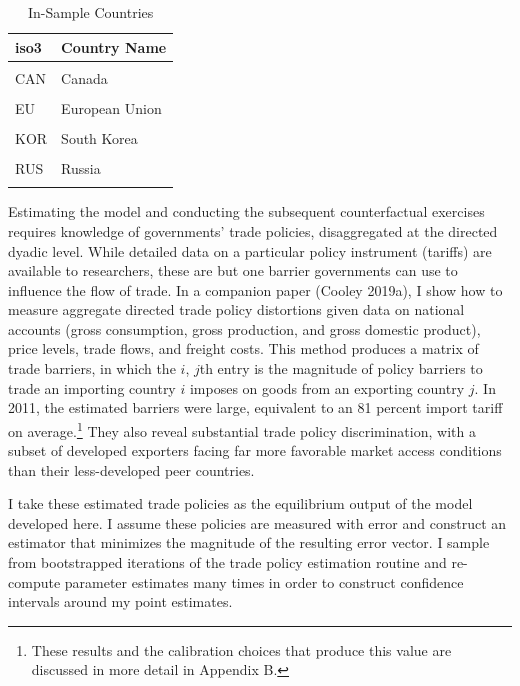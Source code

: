 \documentclass{puthesis}
\begin{document}
\begin{table}

\caption{\label{tab:ccodes}In-Sample Countries \label{tab:ccodes}}
\centering
\begin{tabular}[t]{ll}
\toprule
iso3 & Country Name\\
\midrule
\cellcolor{gray!6}{AUS} & \cellcolor{gray!6}{Australia}\\
CAN & Canada\\
\cellcolor{gray!6}{CHN} & \cellcolor{gray!6}{China}\\
EU & European Union\\
\cellcolor{gray!6}{JPN} & \cellcolor{gray!6}{Japan}\\
\addlinespace
KOR & South Korea\\
\cellcolor{gray!6}{RoW} & \cellcolor{gray!6}{Rest of World}\\
RUS & Russia\\
\cellcolor{gray!6}{USA} & \cellcolor{gray!6}{United States}\\
\bottomrule
\end{tabular}
\end{table}

Estimating the model and conducting the subsequent counterfactual
exercises requires knowledge of governments' trade policies,
disaggregated at the directed dyadic level. While detailed data on a
particular policy instrument (tariffs) are available to researchers,
these are but one barrier governments can use to influence the flow of
trade. In a companion paper (Cooley 2019a), I show how to measure
aggregate directed trade policy distortions given data on national
accounts (gross consumption, gross production, and gross domestic
product), price levels, trade flows, and freight costs. This method
produces a matrix of trade barriers, in which the \(i\), \(j\)th entry
is the magnitude of policy barriers to trade an importing country \(i\)
imposes on goods from an exporting country \(j\). In 2011, the estimated
barriers were large, equivalent to an 81 percent import tariff on
average.\footnote{These results and the calibration choices that produce
  this value are discussed in more detail in Appendix B.} They also
reveal substantial trade policy discrimination, with a subset of
developed exporters facing far more favorable market access conditions
than their less-developed peer countries.

I take these estimated trade policies as the equilibrium output of the
model developed here. I assume these policies are measured with error
and construct an estimator that minimizes the magnitude of the resulting
error vector. I sample from bootstrapped iterations of the trade policy
estimation routine and re-compute parameter estimates many times in
order to construct confidence intervals around my point estimates.
\end{document}
